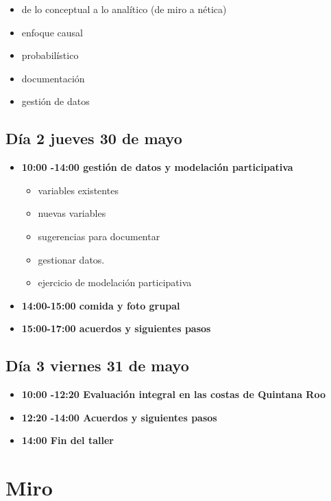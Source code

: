 \documentclass[
  letterpaper,
  DIV=11,
  numbers=noendperiod]{scrreprt}
\providecommand{\tightlist}{%
  \setlength{\itemsep}{0pt}\setlength{\parskip}{0pt}}\usepackage{longtable,booktabs,array}
\begin{document}
\begin{itemize}
  \begin{itemize}
  \tightlist
  \item
    de lo conceptual a lo analítico (de miro a nética)
  \item
    enfoque causal
  \item
    probabilístico
  \item
    documentación
  \item
    gestión de datos
  \end{itemize}
\end{itemize}

\subsection{Día 2 jueves 30 de mayo}\label{duxeda-2-jueves-30-de-mayo}

\begin{itemize}
\item
  \textbf{10:00 -14:00 gestión de datos y modelación participativa}

  \begin{itemize}
  \tightlist
  \item
    variables existentes
  \item
    nuevas variables
  \item
    sugerencias para documentar
  \item
    gestionar datos.
  \item
    ejercicio de modelación participativa
  \end{itemize}
\item
  \textbf{14:00-15:00 comida y foto grupal}
\item
  \textbf{15:00-17:00 acuerdos y siguientes pasos}
\end{itemize}

\subsection{Día 3 viernes 31 de mayo}\label{duxeda-3-viernes-31-de-mayo}

\begin{itemize}
\item
  \textbf{10:00 -12:20 Evaluación integral en las costas de Quintana
  Roo}
\item
  \textbf{12:20 -14:00 Acuerdos y siguientes pasos}
\item
  \textbf{14:00 Fin del taller}
\end{itemize}

\section{Miro}\label{miro}
\end{document}
